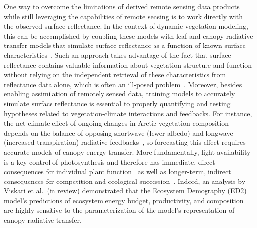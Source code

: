 One way to overcome the limitations of derived remote sensing data products while still leveraging the capabilities of remote sensing is to work directly with the observed surface reflectance.
In the context of dynamic vegetation modeling, this can be accomplished by coupling these models with leaf and canopy radiative transfer models that simulate surface reflectance as a function of known surface characteristics~\cite{quaife_2008_assimilating}.
% 
% 
Such an approach takes advantage of the fact that surface reflectance contains valuable information about vegetation structure and function without relying on the independent retrieval of these characteristics from reflectance data alone, which is often an ill-posed problem~\cite{combal_2003_retrieval,lewis_2007_spectral}.
Moreover, besides enabling assimilation of remotely sensed data, training models to accurately simulate surface reflectance is essential to properly quantifying and testing hypotheses related to vegetation-climate interactions and feedbacks.
For instance, the net climate effect of ongoing changes in Arctic vegetation composition depends on the balance of opposing shortwave (lower albedo) and longwave (increased transpiration) radiative feedbacks~\cite{Swann_2010_changes}, so forecasting this effect requires accurate models of canopy energy transfer.
% 
% 
More fundamentally, light availability is a key control of photosynthesis and therefore has
immediate, direct consequences for individual plant function~\cite{hikosaka_1995_model,robakowski_2004_needle,Niinemets_2016_within,Keenan_2016_global}
as well as longer-term, indirect consequences for competition and ecological succession~\cite{Niinemets_2006_tolerance,Kitajima_2013_leaf,Falster_2017_multitrait}.
Indeed, an analysis by Viskari et al.\ (in review) \nocite{Viskari_inreview_ED} demonstrated that the Ecosystem Demography (ED2) model's predictions of ecosystem energy budget, productivity, and composition are highly sensitive to the parameterization of the model's representation of canopy radiative transfer.
% 
% 
% 

